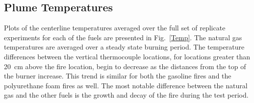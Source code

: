 \documentclass[twoside]{uocthesis}
\begin{document}
{\subsection{Plume Temperatures}

Plots of the centerline temperatures averaged over the full set of replicate experiments for each of the fuels are presented in Fig.~\ref{Temp}. The natural gas temperatures are averaged over a steady state burning period.  The temperature differences between the vertical thermocouple locations, for locations greater than 20~cm above the fire location, begin to decrease as the distances from the top of the burner increase.  This trend is similar for both the gasoline fires and the polyurethane foam fires as well.  The most notable difference between the natural gas and the other fuels is the growth and decay of the fire during the test period.

}
\end{document}
